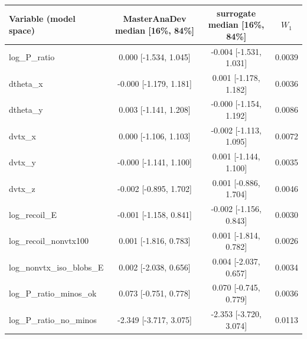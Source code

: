 \begin{tabular}{lccc}
\toprule
Variable (model space) & MasterAnaDev median [16\%, 84\%] & surrogate median [16\%, 84\%] & $W_1$ \\
\midrule
log\_P\_ratio & 0.000 [-1.534, 1.045] & -0.004 [-1.531, 1.031] & 0.0039 \\
dtheta\_x & -0.000 [-1.179, 1.181] & 0.001 [-1.178, 1.182] & 0.0036 \\
dtheta\_y & 0.003 [-1.141, 1.208] & -0.000 [-1.154, 1.192] & 0.0086 \\
dvtx\_x & 0.000 [-1.106, 1.103] & -0.002 [-1.113, 1.095] & 0.0072 \\
dvtx\_y & -0.000 [-1.141, 1.100] & 0.001 [-1.144, 1.100] & 0.0035 \\
dvtx\_z & -0.002 [-0.895, 1.702] & 0.001 [-0.886, 1.704] & 0.0046 \\
log\_recoil\_E & -0.001 [-1.158, 0.841] & -0.002 [-1.156, 0.843] & 0.0030 \\
log\_recoil\_nonvtx100 & 0.001 [-1.816, 0.783] & 0.001 [-1.814, 0.782] & 0.0026 \\
log\_nonvtx\_iso\_blobs\_E & 0.002 [-2.038, 0.656] & 0.004 [-2.037, 0.657] & 0.0034 \\
log\_P\_ratio\_minos\_ok & 0.073 [-0.751, 0.778] & 0.070 [-0.745, 0.779] & 0.0036 \\
log\_P\_ratio\_no\_minos & -2.349 [-3.717, 3.075] & -2.353 [-3.720, 3.074] & 0.0113 \\
\bottomrule
\end{tabular}
